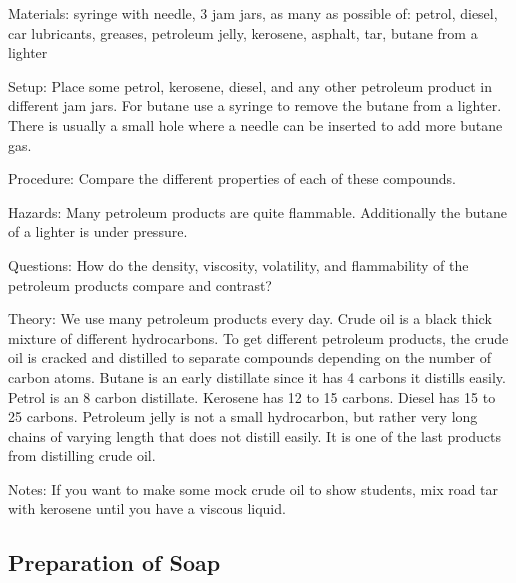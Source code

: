 \begin{multicols}{2}
\begin{description*}
\item[Materials:]{syringe with needle, 3 jam jars, as many as possible of: petrol, diesel, car lubricants, greases, petroleum jelly, kerosene, asphalt, tar, butane from a lighter}
\item[Setup:]{Place some petrol, kerosene, diesel, and any other petroleum product in different jam jars. For butane use a syringe to remove the butane from a lighter. There is usually a small hole where a needle can be inserted to add more butane gas. }
\item[Procedure:]{Compare the different properties of each of these compounds.}
\item[Hazards:]{Many petroleum products are quite flammable. Additionally the butane of a lighter is under pressure.}
\item[Questions:]{How do the density, viscosity, volatility, and flammability of the petroleum products compare and contrast?}
\item[Theory:]{We use many petroleum products every day. Crude oil is a black thick mixture of different hydrocarbons. To get different petroleum products, the crude oil is cracked and distilled to separate compounds depending on the number of carbon atoms. Butane is an early distillate since it has 4 carbons it distills easily. Petrol is an 8 carbon distillate. Kerosene has 12 to 15 carbons. Diesel has 15 to 25 carbons. Petroleum jelly is not a small hydrocarbon, but rather very long chains of varying length that does not distill easily. It is one of the last products from distilling crude oil.}
\item[Notes:]{If you want to make some mock crude oil to show students, mix road tar with kerosene until you have a viscous liquid.}
\end{description*}

\subsection{Preparation of Soap} 



\end{multicols}
